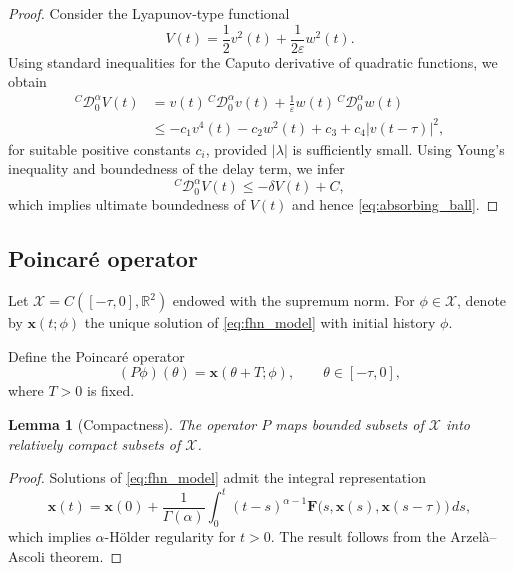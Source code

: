 \documentclass[12pt,a4paper]{article}
\newtheorem{lemma}[theorem]{Lemma}
\numberwithin{equation}{section}
\begin{document}
	\begin{proof}
		Consider the Lyapunov-type functional
		\begin{equation}
			V(t) = \frac{1}{2}v^2(t) + \frac{1}{2\varepsilon}w^2(t).
			\label{eq:lyapunov}
		\end{equation}
		Using standard inequalities for the Caputo derivative of quadratic functions, we obtain
		\begin{align}
			^{C}\mathcal{D}_{0}^{\alpha} V(t) &= v(t)\,^{C}\mathcal{D}_{0}^{\alpha} v(t) + \frac{1}{\varepsilon}w(t)\,^{C}\mathcal{D}_{0}^{\alpha} w(t) \label{eq:lyapunov_derivative_1} \\
			&\le - c_1 v^4(t) - c_2 w^2(t) + c_3 + c_4 |v(t-\tau)|^2, \label{eq:lyapunov_derivative_2}
		\end{align}
		for suitable positive constants $c_i$, provided $|\lambda|$ is sufficiently small. Using Young’s inequality and boundedness of the delay term, we infer
		\begin{equation}
			^{C}\mathcal{D}_{0}^{\alpha} V(t) \le - \delta V(t) + C,
			\label{eq:lyapunov_dissipative}
		\end{equation}
		which implies ultimate boundedness of $V(t)$ and hence \eqref{eq:absorbing_ball}.
	\end{proof}
	
	\subsection*{Poincaré operator}
	Let $\mathcal{X}=C([-\tau,0],\mathbb{R}^2)$ endowed with the supremum norm. For $\phi\in\mathcal{X}$, denote by $\mathbf{x}(t;\phi)$ the unique solution of \eqref{eq:fhn_model} with initial history $\phi$.
	
	Define the Poincaré operator
	\begin{equation}
		(P\phi)(\theta) = \mathbf{x}(\theta+T;\phi), \qquad \theta\in[-\tau,0],
		\label{eq:poincare_operator}
	\end{equation}
	where $T>0$ is fixed.
	
	\begin{lemma}[Compactness]
		\label{lem:compactness}
		The operator $P$ maps bounded subsets of $\mathcal{X}$ into relatively compact subsets of $\mathcal{X}$.
	\end{lemma}
	
	\begin{proof}
		Solutions of \eqref{eq:fhn_model} admit the integral representation
		\begin{equation}
			\mathbf{x}(t) = \mathbf{x}(0) + \frac{1}{\Gamma(\alpha)} \int_0^t (t-s)^{\alpha-1} \mathbf{F}\bigl(s,\mathbf{x}(s),\mathbf{x}(s-\tau)\bigr)\,ds,
			\label{eq:fhn_integral}
		\end{equation}
		which implies $\alpha$-Hölder regularity for $t>0$. The result follows from the Arzelà--Ascoli theorem.
	\end{proof}
	
\end{document}
